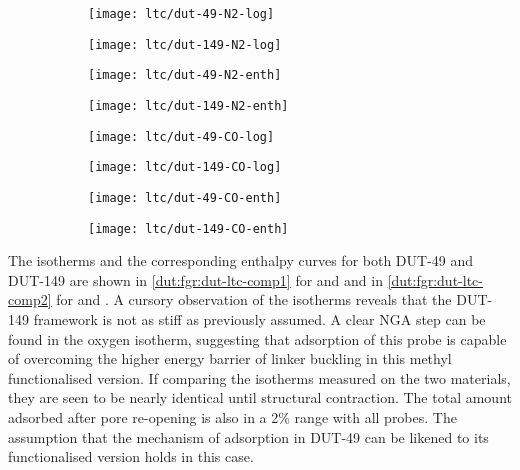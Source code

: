 \begin{figure}[p]
    \centering
    \begin{subfigure}{0.43\linewidth}
        \texttt{[image: ltc/dut-49-N2-log]}%
    \end{subfigure}%
    \begin{subfigure}{0.43\linewidth}
        \texttt{[image: ltc/dut-149-N2-log]}%
    \end{subfigure}%

    \begin{subfigure}{0.43\linewidth}
        \texttt{[image: ltc/dut-49-N2-enth]}%
    \end{subfigure}%
    \begin{subfigure}{0.43\linewidth}
        \texttt{[image: ltc/dut-149-N2-enth]}%
    \end{subfigure}%

    \begin{subfigure}{0.43\linewidth}
        \texttt{[image: ltc/dut-49-CO-log]}%
    \end{subfigure}%
    \begin{subfigure}{0.43\linewidth}
        \texttt{[image: ltc/dut-149-CO-log]}%
    \end{subfigure}%

    \begin{subfigure}{0.43\linewidth}
        \texttt{[image: ltc/dut-49-CO-enth]}%
    \end{subfigure}%
    \begin{subfigure}{0.43\linewidth}
        \texttt{[image: ltc/dut-149-CO-enth]}%
    \end{subfigure}%

    \caption{}%
    \label{dut:fgr:dut-ltc-comp1}
\end{figure}

The isotherms and the corresponding enthalpy curves for both 
DUT-49 and DUT-149 are shown in \autoref{dut:fgr:dut-ltc-comp1}
for  and  and in \autoref{dut:fgr:dut-ltc-comp2}
for  and . A cursory observation of the isotherms
reveals that the DUT-149 framework is not as stiff as 
previously assumed. A clear NGA step can be found in the 
oxygen isotherm, suggesting that adsorption of this probe is capable 
of overcoming the higher energy barrier of linker buckling in 
this methyl functionalised version.
If comparing the isotherms measured on the two materials, they
are seen to be nearly identical until structural contraction.
The total amount adsorbed after pore re-opening is also in a 
2\% range with all probes. The assumption that the mechanism 
of adsorption in DUT-49 can be likened to its functionalised
version holds in this case.

